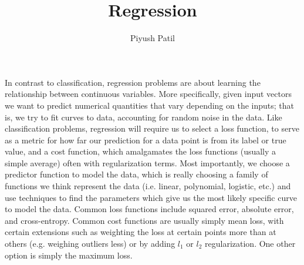 \documentclass{article}
\begin{document}
\title{Regression}
\author{Piyush Patil}
\maketitle

In contrast to classification, regression problems are about learning the relationship between continuous variables. More specifically, given input vectors we want to predict numerical quantities that vary depending on the inputs; that is, we try to fit curves to data, accounting for random noise in the data. Like classification problems, regression will require us to select a loss function, to serve as a metric for how far our prediction for a data point is from its label or true value, and a cost function, which amalgamates the loss functions (usually a simple average) often with regularization terms. Most importantly, we choose a predictor function to model the data, which is really choosing a family of functions we think represent the data (i.e. linear, polynomial, logistic, etc.) and use techniques to find the parameters which give us the most likely specific curve to model the data.
\newline \newline
Common loss functions include squared error, absolute error, and cross-entropy. Common cost functions are usually simply mean loss, with certain extensions such as weighting the loss at certain points more than at others (e.g. weighing outliers less) or by adding $ l_1 $ or $ l_2 $ regularization. One other option is simply the maximum loss.
\end{document}
